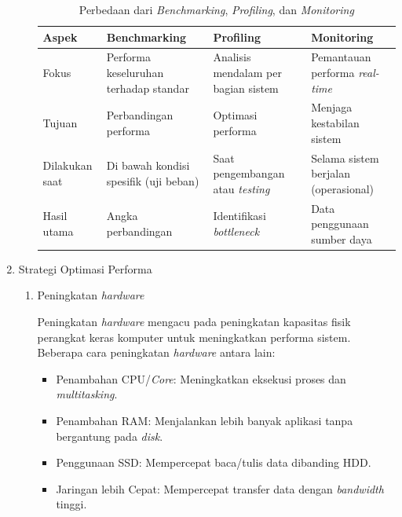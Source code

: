 \documentclass[12pt]{article}
\begin{document}
\begin{enumerate}
\begin{enumerate}
            \begin{table}[htbp]
            \centering
                \begin{tabular}{|p{2cm}|p{3cm}|p{3cm}|p{3cm}|}
                \hline
                Aspek & Benchmarking & Profiling & Monitoring \\
                \hline
                Fokus & Performa keseluruhan terhadap standar & Analisis mendalam per bagian sistem & Pemantauan performa \textit{real-time} \\
                \hline
                Tujuan & Perbandingan performa & Optimasi performa & Menjaga kestabilan sistem \\
                \hline
                Dilakukan saat & Di bawah kondisi spesifik (uji beban) & Saat pengembangan atau \textit{testing} & Selama sistem berjalan (operasional) \\
                \hline
                Hasil utama & Angka perbandingan & Identifikasi \textit{bottleneck} & Data penggunaan sumber daya \\
                \hline
                \end{tabular}
                \caption{Perbedaan dari \textit{Benchmarking}, \textit{Profiling}, dan \textit{Monitoring}}
                \label{table:ringkasan_perbedaan}
            \end{table}
        \end{enumerate}
            
    \item {Strategi Optimasi Performa}
        \begin{enumerate}
            \item Peningkatan \textit{hardware}
            \par Peningkatan \textit{hardware} mengacu pada peningkatan kapasitas fisik perangkat keras komputer untuk meningkatkan performa sistem. Beberapa cara peningkatan \textit{hardware} antara lain:
            \begin{itemize}
                \item Penambahan CPU/\textit{Core}: Meningkatkan eksekusi proses dan \textit{multitasking}.
                \item Penambahan RAM: Menjalankan lebih banyak aplikasi tanpa bergantung pada \textit{disk}.
                \item Penggunaan SSD: Mempercepat baca/tulis data dibanding HDD.
                \item Jaringan lebih Cepat: Mempercepat transfer data dengan \textit{bandwidth} tinggi.
            \end{itemize}
            

\end{enumerate}
\end{enumerate}
\end{document}
